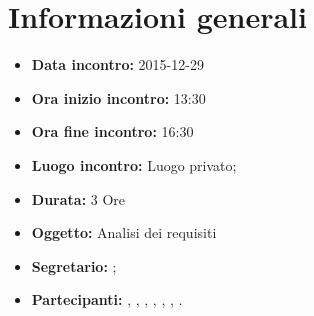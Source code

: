 \newpage
\section{Informazioni generali}
\begin{itemize}
\item \textbf{Data incontro:} 2015-12-29
\item \textbf{Ora inizio incontro:} 13:30
\item \textbf{Ora fine incontro:} 16:30
\item \textbf{Luogo incontro:} Luogo privato;
\item \textbf{Durata:} 3 Ore
\item \textbf{Oggetto:} Analisi dei requisiti
\item \textbf{Segretario:} \GN;
\item \textbf{Partecipanti:} \AF, \FB, \GN, \GR, \MV, \MP, \SM.

\end{itemize}
